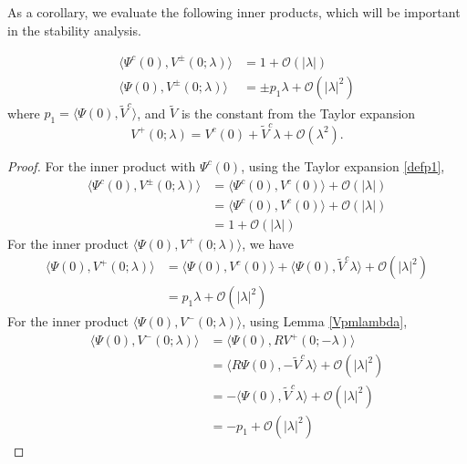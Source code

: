 \documentclass[thesis.tex]{subfiles}
\begin{document}
As a corollary, we evaluate the following inner products, which will be important in the stability analysis.

\begin{corollary}\label{VpmPsiIPcorr}
\begin{equation}\label{VpmIPs}
\begin{aligned}
\langle \Psi^c(0), V^\pm(0; \lambda) \rangle &= 1 + \mathcal{O}(|\lambda|) \\
\langle \Psi(0), V^\pm(0; \lambda) \rangle &= \pm p_1 \lambda + \mathcal{O}(|\lambda|^2)
\end{aligned}
\end{equation}
where $p_1 = \langle \Psi(0), \tilde{V}^c \rangle$, and $\tilde{V}$ is the constant from the Taylor expansion
\begin{equation}\label{defp1}
V^+(0; \lambda) = V^c(0) + \tilde{V}^c \lambda + \mathcal{O}(\lambda^2).
\end{equation}
\begin{proof}
For the inner product with $\Psi^c(0)$, using the Taylor expansion \eqref{defp1},
\begin{align*}
\langle \Psi^c(0), V^\pm(0; \lambda) \rangle &= 
\langle \Psi^c(0), V^c(0) \rangle + \mathcal{O}(|\lambda|) \\
&= \langle \Psi^c(0), V^c(0) \rangle + \mathcal{O}(|\lambda|) \\
&= 1 + \mathcal{O}(|\lambda|)
\end{align*}
For the inner product $\langle \Psi(0), V^+(0; \lambda) \rangle$, we have
\begin{align*}
\langle \Psi(0), V^+(0; \lambda) \rangle 
&= \langle \Psi(0), V^c(0) \rangle + \langle \Psi(0), \tilde{V}^c \lambda \rangle + \mathcal{O}(|\lambda|^2) \\
&= p_1 \lambda + \mathcal{O}(|\lambda|^2)
\end{align*}
For the inner product $\langle \Psi(0), V^-(0; \lambda) \rangle$, using Lemma \ref{Vpmlambda},
\begin{align*}
\langle \Psi(0), V^-(0; \lambda) \rangle &= 
\langle \Psi(0), R V^+(0; -\lambda) \rangle \\
&= \langle R \Psi(0), -\tilde{V}^c \lambda \rangle + \mathcal{O}(|\lambda|^2) \\
&= -\langle \Psi(0), \tilde{V}^c \lambda \rangle + \mathcal{O}(|\lambda|^2) \\
&= -p_1 + \mathcal{O}(|\lambda|^2)
\end{align*}
\end{proof}
\end{corollary}
\end{document}
